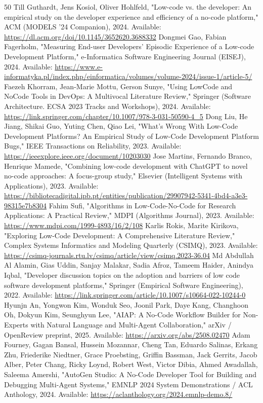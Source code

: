 \documentclass[conference]{IEEEtran}
\begin{document}
\begin{thebibliography}{50}
 Till Guthardt, Jens Kosiol, Oliver Hohlfeld, "Low-code vs. the developer: An empirical study on the developer experience and efficiency of a no-code platform," ACM (MODELS '24 Companion), 2024. Available: \url{https://dl.acm.org/doi/10.1145/3652620.3688332}
 Dongmei Gao, Fabian Fagerholm, "Measuring End-user Developers' Episodic Experience of a Low-code Development Platform," e-Informatica Software Engineering Journal (EISEJ), 2024. Available: \url{https://www.e-informatyka.pl/index.php/einformatica/volumes/volume-2024/issue-1/article-5/}
 Faezeh Khorram, Jean-Marie Mottu, Gerson Sunye, "Using LowCode and NoCode Tools in DevOps: A Multivocal Literature Review," Springer (Software Architecture. ECSA 2023 Tracks and Workshops), 2024. Available: \url{https://link.springer.com/chapter/10.1007/978-3-031-50590-4_5}
 Dong Liu, He Jiang, Shikai Guo, Yuting Chen, Qiao Lei, "What's Wrong With Low-Code Development Platforms? An Empirical Study of Low-Code Development Platform Bugs," IEEE Transactions on Reliability, 2023. Available: \url{https://ieeexplore.ieee.org/document/10203030}
 Jose Martins, Fernando Branco, Henrique Mamede, "Combining low-code development with ChatGPT to novel no-code approaches: A focus-group study," Elsevier (Intelligent Systems with Applications), 2023. Available: \url{https://bibliotecadigital.ipb.pt/entities/publication/29907942-5341-4bd4-a3e3-98315e7b8304}
 Fahim Sufi, "Algorithms in Low-Code-No-Code for Research Applications: A Practical Review," MDPI (Algorithms Journal), 2023. Available: \url{https://www.mdpi.com/1999-4893/16/2/108}
 Karlis Rokis, Marite Kirikova, "Exploring Low-Code Development: A Comprehensive Literature Review," Complex Systems Informatics and Modeling Quarterly (CSIMQ), 2023. Available: \url{https://csimq-journals.rtu.lv/csimq/article/view/csimq.2023-36.04}
 Md Abdullah Al Alamin, Gias Uddin, Sanjay Malakar, Sadia Afroz, Tameem Haider, Anindya Iqbal, "Developer discussion topics on the adoption and barriers of low code software development platforms," Springer (Empirical Software Engineering), 2022. Available: \url{https://link.springer.com/article/10.1007/s10664-022-10244-0}
 Hyunjn An, Yongwon Kim, Wonduk Seo, Joonil Park, Daye Kang, Changhoon Oh, Dokyun Kim, Seunghyun Lee, "AIAP: A No-Code Workflow Builder for Non-Experts with Natural Language and Multi-Agent Collaboration," arXiv / OpenReview preprint, 2025. Available: \url{https://arxiv.org/abs/2508.02470}
 Adam Fourney, Gagan Bansal, Hussein Mozannar, Cheng Tan, Eduardo Salinas, Erkang Zhu, Friederike Niedtner, Grace Proebsting, Griffin Bassman, Jack Gerrits, Jacob Alber, Peter Chang, Ricky Loynd, Robert West, Victor Dibia, Ahmed Awadallah, Saleema Amershi, "AutoGen Studio: A No-Code Developer Tool for Building and Debugging Multi-Agent Systems," EMNLP 2024 System Demonstrations / ACL Anthology, 2024. Available: \url{https://aclanthology.org/2024.emnlp-demo.8/}

\end{thebibliography}
\end{document}
